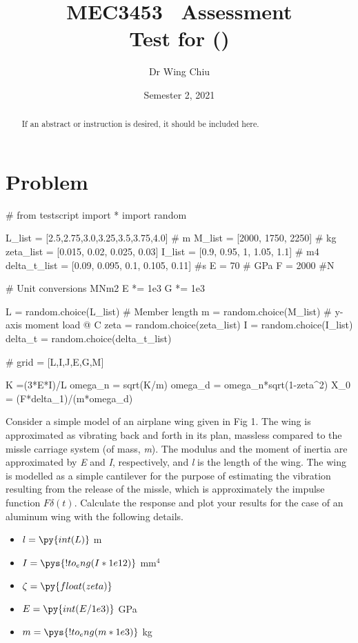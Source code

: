 \documentclass[a4paper,11pt]{article}
\title{MEC3453 \ Assessment\\Test for \VAR{FullName} (\VAR{StudentID})}
\date{Semester 2, 2021}
\author{Dr Wing Chiu}
\begin{document}
\maketitle

\begin{abstract}



If an abstract or instruction is desired, it should be included here.
\end{abstract}

\newpage

\section{Problem}

\begin{pycode}
#	from testscript import *
	import random
	
	L_list = [2.5,2.75,3.0,3.25,3.5,3.75,4.0]  # m
	M_list = [2000, 1750, 2250]	# kg
	zeta_list = [0.015, 0.02, 0.025, 0.03]
	I_list = [0.9, 0.95, 1, 1.05, 1.1] 	# m4
	delta_t_list = [0.09, 0.095, 0.1, 0.105, 0.11] #s
	E = 70     	# GPa
	F = 2000   	#N
	
	# Unit conversions MNm2
	E *= 1e3
	G *= 1e3
	
	L = random.choice(L_list) 		# Member length
	m = random.choice(M_list) 		# y-axis moment load @ C
	zeta = random.choice(zeta_list)
	I = random.choice(I_list)
	delta_t = random.choice(delta_t_list)	


#	grid = [L,I,J,E,G,M]
	
	K =(3*E*I)/L
	omega_n = sqrt(K/m)
	omega_d = omega_n*sqrt(1-zeta^2)
	X_0 = (F*delta_1)/(m*omega_d)
	

\end{pycode}

Consider a simple model of an airplane wing given in Fig 1. The wing is approximated as vibrating back and forth in its plan, massless compared to the missle carriage system (of mass, \emph{m}). The modulus and the moment of inertia are approximated by \emph{E} and \emph{I}, respectively, and \emph{l} is the length of the wing. The wing is modelled as a simple cantilever for the purpose of estimating the vibration resulting from the release of the missle, which is approximately the impulse function $\mathit{F\delta(t)}$.\hfill \break \break
Calculate the response and plot your results for the case of an aluminum wing with the following details.

\begin{itemize} %
	\item $l = \py{int(L)}$ m
	\item $I = \pys{!{to_eng(I*1e12)}}$ mm$^4$
	\item $\zeta = \py{float(zeta)}$
	\item $E = \py{int(E/1e3)}$ GPa
	\item $m = \pys{!{to_eng(m*1e3)}}$ kg
\end{itemize}
\end{document}
